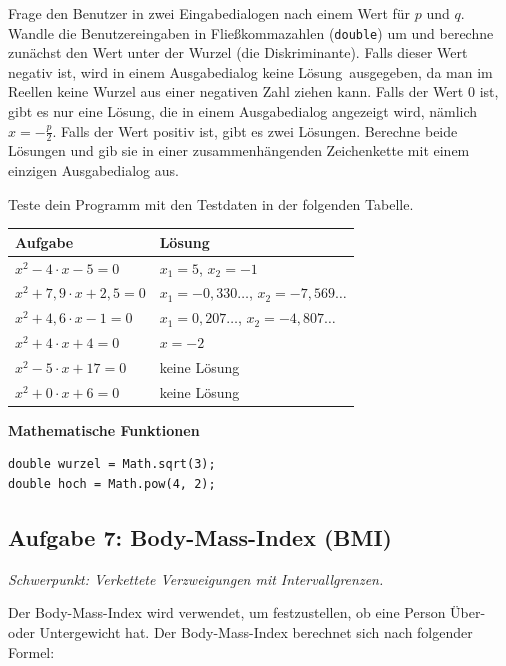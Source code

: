 Frage den Benutzer in zwei Eingabedialogen nach einem Wert für $p$ und $q$.
Wandle die Benutzereingaben in Fließkommazahlen (\lstinline|double|) um und
berechne zunächst den Wert unter der Wurzel (die Diskriminante). Falls dieser
Wert negativ ist, wird in einem Ausgabedialog \glqq keine Lösung\grqq\
ausgegeben, da man im Reellen keine Wurzel aus einer negativen Zahl ziehen
kann. Falls der Wert $0$ ist, gibt es nur eine Lösung, die in einem
Ausgabedialog angezeigt wird, nämlich $x = - \frac{p}{2}$. Falls der Wert
positiv ist, gibt es zwei Lösungen. Berechne beide Lösungen und gib sie in
einer zusammenhängenden Zeichenkette mit einem einzigen Ausgabedialog aus.

Teste dein Programm mit den Testdaten in der folgenden Tabelle.

\medskip
\begin{minipage}{0.58\textwidth}
\begin{tabular}{|l|l|}\hline
\textbf{Aufgabe} & \textbf{Lösung}
\\ \hline
$x^2 - 4 \cdot x - 5 = 0$ & $x_1 = 5$, $x_2 = -1$
\\ 
$x^2 + 7{,}9 \cdot x + 2,5 = 0$ & $x_1 = -0{,}330\ldots$, $x_2 = -7{,}569\ldots$
\\ 
$x^2 + 4{,}6 \cdot x - 1 = 0$ & $x_1 = 0{,}207\ldots$, $x_2 = -4{,}807\ldots$
\\ 
$x^2 + 4 \cdot x + 4 = 0$ & $x = -2$
\\ 
$x^2 - 5 \cdot x + 17 = 0$ & keine Lösung
\\ 
$x^2 + 0 \cdot x + 6 = 0$ & keine Lösung
\\ \hline
\end{tabular}
\end{minipage}\hfill
\begin{minipage}{0.40\textwidth}
\textbf{Mathematische Funktionen}

\begin{lstlisting}
double wurzel = Math.sqrt(3);
double hoch = Math.pow(4, 2);
\end{lstlisting}
\end{minipage}


\subsection{Aufgabe 7: Body-Mass-Index (BMI) \tagZusatz}
\noindent \emph{Schwerpunkt: Verkettete Verzweigungen mit Intervallgrenzen.}

Der Body-Mass-Index wird verwendet, um festzustellen, ob eine Person Über-
oder Untergewicht hat. Der Body-Mass-Index berechnet sich nach folgender
Formel:

